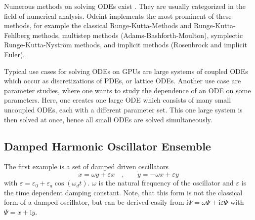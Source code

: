 \documentclass[1p]{elsarticle}
\newcommand {\ii} {\text{i}}
\begin{document}
Numerous methods on solving ODEs exist \cite{HairerSolvingODEI,
HairerSolvingODEII, HairerGeometricNumericalIntegration2006}. They are usually
categorized in the field of numerical analysis. Odeint implements the most
prominent of these methods, for example the classical Runge-Kutta-Methods and
Runge-Kutta-Fehlberg methods, multistep methods (Adams-Bashforth-Moulton),
symplectic Runge-Kutta-Nystr\"om methods, and implicit methods (Rosenbrock and
implicit Euler).

Typical use cases for solving ODEs on GPUs are large systems of
coupled ODEs which occur as discretizations of PDEs, or lattice
ODEs. Another use case are parameter studies, where one wants to study
the dependence of an ODE on some parameters. Here, one creates one
large ODE which consists of many small uncoupled ODEs, each with a
different parameter set. This one large system is then solved at once,
hence all small ODEs are solved simultaneously.




%
%
\subsection{Damped Harmonic Oscillator Ensemble}

The first example is a set of damped driven oscillators
\begin{equation} \label{eq:dampedsystem}
    \dot{x} = \omega y + \varepsilon x \quad \text{,} \quad \quad
    \dot{y} = -\omega x + \varepsilon y
\end{equation}
with $\varepsilon = \varepsilon_0 + \varepsilon_a \cos \left( \omega_d
t \right)$. $\omega$ is the natural frequency of the oscillator and
$\varepsilon$ is the time dependent damping constant.  Note, that this form is
not the classical form of a damped oscillator, but can be derived easily from
$\ii \dot{\Psi} = \omega \Psi + \ii \varepsilon \Psi$ with $\Psi = x + \ii y$.
\end{document}

